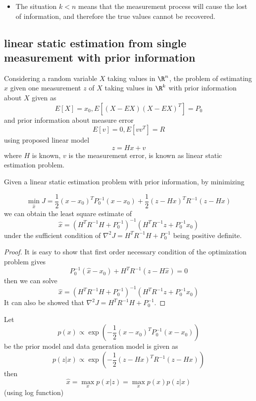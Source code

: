 \begin{refsection}
\begin{remark}[interpretation]\hfill
\begin{itemize}
	\item The situation $k < n$ means that the measurement process will cause the lost of information, and therefore the true values cannot be recovered.
\end{itemize}
\end{remark}



\subsection{linear static estimation from single measurement with prior information}
\begin{definition}
	Considering a random variable $X$ taking values in $\R^n$, the problem of estimating $x$ given one measurement $z$ of $X$ taking values in $\R^k$ with prior information about $X$ given as
	$$E[X] = x_0, E[(X-EX)(X-EX)^T] = P_0$$
	and prior information about measure error
	$$E[v]= 0, E[vv^T] = R$$
		 using proposed linear model
	$$z = Hx + v$$
	where $H$ is known, $v$ is the measurement error, is known as linear static estimation problem.
\end{definition}


\begin{theorem}\cite[308]{stengel2012optimal}
	Given a linear static estimation problem with prior information, by minimizing
	
	
	$$\min_{\hat{x}} J = \frac{1}{2}(x - x_0)^TP_0^{-1}(x - x_0) + \frac{1}{2}(z-Hx)^TR^{-1}(z - Hx)$$
	we can obtain the least square estimate of
	$$\hat{x} = (H^TR^{-1}H + P_0^{-1})^{-1}(H^TR^{-1}z + P_0^{-1}x_0)$$
	under the sufficient condition of $\nabla^2 J = H^TR^{-1}H + P_0^{-1}$ being positive definite.
\end{theorem}
\begin{proof}
	It is easy to show that first order necessary condition of the optimization problem gives
	$$P^{-1}_0(\hat{x} - x_0) + H^TR^{-1}(z - H\hat{x}) = 0$$
	then we can solve
		$$\hat{x} = (H^TR^{-1}H + P_0^{-1})^{-1}(H^TR^{-1}z + P_0^{-1}x_0)$$
	It can also be showed that $\nabla^2 J = H^TR^{-1}H + P_0^{-1}$.
\end{proof}

\begin{remark}
Let $$p(x) \propto \exp(-\frac{1}{2}(x-x_0)^TP_0^{-1}(x-x_0))$$ be the prior model and data generation model is given as $$p(z|x)\propto \exp(-\frac{1}{2}(z-Hx)^TR^{-1}(z-Hx)) $$
then 
$$\hat{x} = \max_x p(x|z) = \max_x p(x)p(z|x)$$
(using log function)\\


\end{remark}
\end{refsection}
